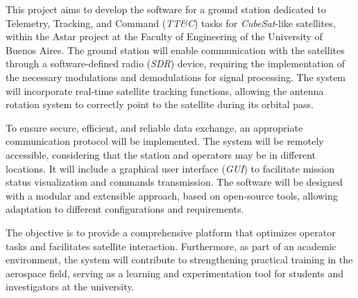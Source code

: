 This project aims to develop the software for a ground station dedicated to Telemetry, Tracking, and Command (\textit{TT\&C}) tasks for \textit{CubeSat}-like satellites, within the Astar project at the Faculty of Engineering of the University of Buenos Aires. The ground station will enable communication with the satellites through a software-defined radio (\textit{SDR}) device, requiring the implementation of the necessary modulations and demodulations for signal processing. The system will incorporate real-time satellite tracking functions, allowing the antenna rotation system to correctly point to the satellite during its orbital pass.

To ensure secure, efficient, and reliable data exchange, an appropriate communication protocol will be implemented. The system will be remotely accessible, considering that the station and operators may be in different locations. It will include a graphical user interface (\textit{GUI}) to facilitate mission status visualization and commands transmission. The software will be designed with a modular and extensible approach, based on open-source tools, allowing adaptation to different configurations and requirements.

The objective is to provide a comprehensive platform that optimizes operator tasks and facilitates satellite interaction. Furthermore, as part of an academic environment, the system will contribute to strengthening practical training in the aerospace field, serving as a learning and experimentation tool for students and investigators at the university.
